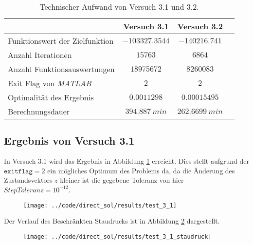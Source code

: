 \begin{table}[H]
    \centering
    \caption{Technischer Aufwand von Versuch 3.1 und 3.2.}\label{tab:Versuch3_TA}
    \begin{tabularx}{.9\textwidth}{Zccc}
        \toprule
         & \textbf{Versuch 3.1} & \textbf{Versuch 3.2} \\
        \midrule
        Funktionswert der Zielfunktion & $-103327.3544$ & $-140216.741$ \\
        Anzahl Iterationen & $15763$ & $6864$ \\
        Anzahl Funktionsauswertungen & $18975672$ & $8260083$ \\
        Exit Flag von \textit{MATLAB} & $2$ & $2$ \\
        Optimalität des Ergebnis & $0.0011298$ & $0.00015495$ \\
        Berechnungsdauer & $394.887 \ min$ & $262.6699 \ min$ \\
        \bottomrule
    \end{tabularx}
\end{table}





\subsection{Ergebnis von Versuch 3.1}\label{kap:Versuch31}
In Versuch 3.1 wird das Ergebnis in Abbildung \ref{img:test_3_1} erreicht. Dies stellt aufgrund der $\texttt{exitflag} = 2$ ein mögliches Optimum des Problems da, da die Änderung des Zustandsvektors $z$ kleiner ist die gegebene Toleranz von hier $StepToleranz = 10^{-12}$.
\begin{figure}[H]
\begin{center}
\texttt{[image: ../code/direct\_sol/results/test\_3\_1]}
 \label{img:test_3_1}
\end{center}
\end{figure}
Der Verlauf des Beschränkten Staudrucks ist in Abbildung \ref{img:test_3_1_staudruck} dargestellt.
\begin{figure}[H]
\begin{center}
\texttt{[image: ../code/direct\_sol/results/test\_3\_1\_staudruck]}
\label{img:test_3_1_staudruck}
\end{center}
\end{figure}




